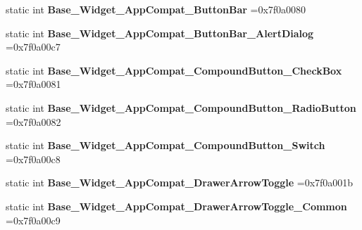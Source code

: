 \begin{DoxyCompactItemize}
\item 
\mbox{\label{classandroid_1_1support_1_1v7_1_1appcompat_1_1R_1_1style_a1fa1d30e8b008ba26acc9c4e4fe5e5d5}} 
static int {\bfseries Base\+\_\+\+Widget\+\_\+\+App\+Compat\+\_\+\+Button\+Bar} =0x7f0a0080
\item 
\mbox{\label{classandroid_1_1support_1_1v7_1_1appcompat_1_1R_1_1style_ac1db5ad452fd351969360433166031ad}} 
static int {\bfseries Base\+\_\+\+Widget\+\_\+\+App\+Compat\+\_\+\+Button\+Bar\+\_\+\+Alert\+Dialog} =0x7f0a00c7
\item 
\mbox{\label{classandroid_1_1support_1_1v7_1_1appcompat_1_1R_1_1style_a374497a20227cddde8adad766ff37220}} 
static int {\bfseries Base\+\_\+\+Widget\+\_\+\+App\+Compat\+\_\+\+Compound\+Button\+\_\+\+Check\+Box} =0x7f0a0081
\item 
\mbox{\label{classandroid_1_1support_1_1v7_1_1appcompat_1_1R_1_1style_ae8de88dff937612d0e6c0c3e098509d0}} 
static int {\bfseries Base\+\_\+\+Widget\+\_\+\+App\+Compat\+\_\+\+Compound\+Button\+\_\+\+Radio\+Button} =0x7f0a0082
\item 
\mbox{\label{classandroid_1_1support_1_1v7_1_1appcompat_1_1R_1_1style_a3df014c0100584be8ff8aa8e38565d02}} 
static int {\bfseries Base\+\_\+\+Widget\+\_\+\+App\+Compat\+\_\+\+Compound\+Button\+\_\+\+Switch} =0x7f0a00c8
\item 
\mbox{\label{classandroid_1_1support_1_1v7_1_1appcompat_1_1R_1_1style_a73e2dea9eab538d57b18e9a32f9e9993}} 
static int {\bfseries Base\+\_\+\+Widget\+\_\+\+App\+Compat\+\_\+\+Drawer\+Arrow\+Toggle} =0x7f0a001b
\item 
\mbox{\label{classandroid_1_1support_1_1v7_1_1appcompat_1_1R_1_1style_ae38c7ee773c5097d9b3e0122e247b069}} 
static int {\bfseries Base\+\_\+\+Widget\+\_\+\+App\+Compat\+\_\+\+Drawer\+Arrow\+Toggle\+\_\+\+Common} =0x7f0a00c9
\item 

\end{DoxyCompactItemize}
